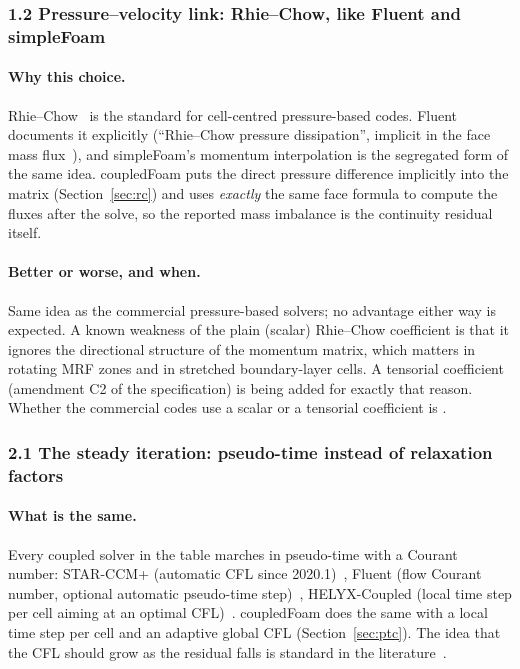 \subsubsection*{1.2 Pressure--velocity link: Rhie--Chow, like Fluent and
simpleFoam}

\paragraph{Why this choice.} Rhie--Chow~\cite{RhieChow1983} is the
standard for cell-centred pressure-based codes. Fluent documents it
explicitly (``Rhie--Chow pressure dissipation'', implicit in the face mass
flux~\cite{cmp-Fluent12TG}), and simpleFoam's momentum interpolation is the
segregated form of the same idea. coupledFoam puts the direct pressure
difference implicitly into the matrix (Section~\ref{sec:rc}) and uses
\emph{exactly} the same face formula to compute the fluxes after the solve,
so the reported mass imbalance is the continuity residual itself.

\paragraph{Better or worse, and when.} Same idea as the commercial
pressure-based solvers; no advantage either way is expected. A known
weakness of the plain (scalar) Rhie--Chow coefficient is that it ignores
the directional structure of the momentum matrix, which matters in rotating
MRF zones and in stretched boundary-layer cells. A tensorial coefficient
(amendment C2 of the specification) is being added for exactly that reason.
Whether the commercial codes use a scalar or a tensorial coefficient is
\cmpnpd.

\subsubsection*{2.1 The steady iteration: pseudo-time instead of
relaxation factors}

\paragraph{What is the same.} Every coupled solver in the table marches in
pseudo-time with a Courant number: STAR-CCM+ (automatic CFL since
2020.1)~\cite{cmp-StarEffortless2020}, Fluent (flow Courant number, optional
automatic pseudo-time step)~\cite{cmp-Fluent12UG,cmp-FluentPseudoTime},
HELYX-Coupled (local time step per cell aiming at an optimal
CFL)~\cite{cmp-HelyxTechniques}. coupledFoam does the same with a local time
step per cell and an adaptive global CFL (Section~\ref{sec:ptc}). The idea
that the CFL should grow as the residual falls is standard in the
literature~\cite{MulderVanLeer1985,Kelley1998,Ceze2013AIAA}.

